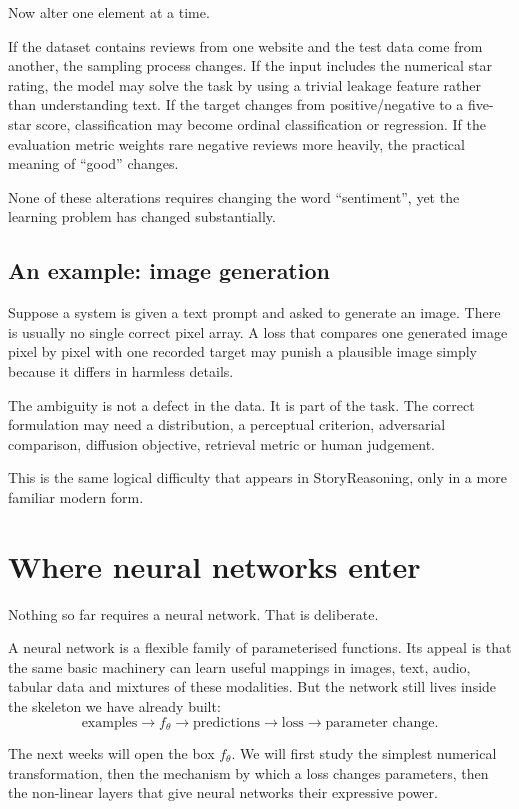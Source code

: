 Now alter one element at a time.

If the dataset contains reviews from one website and the test data come from another, the sampling process changes. If the input includes the numerical star rating, the model may solve the task by using a trivial leakage feature rather than understanding text. If the target changes from positive/negative to a five-star score, classification may become ordinal classification or regression. If the evaluation metric weights rare negative reviews more heavily, the practical meaning of ``good'' changes.

None of these alterations requires changing the word ``sentiment'', yet the learning problem has changed substantially.

\subsection{An example: image generation}

Suppose a system is given a text prompt and asked to generate an image. There is usually no single correct pixel array. A loss that compares one generated image pixel by pixel with one recorded target may punish a plausible image simply because it differs in harmless details.

The ambiguity is not a defect in the data. It is part of the task. The correct formulation may need a distribution, a perceptual criterion, adversarial comparison, diffusion objective, retrieval metric or human judgement.

This is the same logical difficulty that appears in StoryReasoning, only in a more familiar modern form.

\section{Where neural networks enter}

Nothing so far requires a neural network. That is deliberate.

A neural network is a flexible family of parameterised functions. Its appeal is that the same basic machinery can learn useful mappings in images, text, audio, tabular data and mixtures of these modalities. But the network still lives inside the skeleton we have already built:
\[
  \text{examples}
  \rightarrow
  f_\theta
  \rightarrow
  \text{predictions}
  \rightarrow
  \text{loss}
  \rightarrow
  \text{parameter change}.
\]

The next weeks will open the box \(f_\theta\). We will first study the simplest numerical transformation, then the mechanism by which a loss changes parameters, then the non-linear layers that give neural networks their expressive power.

